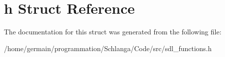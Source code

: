 \hypertarget{structsdl__functions_1_1h}{\section{h Struct Reference}
\label{structsdl__functions_1_1h}
}


The documentation for this struct was generated from the following file\-:\begin{DoxyCompactItemize}
\item 
/home/germain/programmation/\-Schlanga/\-Code/src/sdl\-\_\-functions.\-h\end{DoxyCompactItemize}
